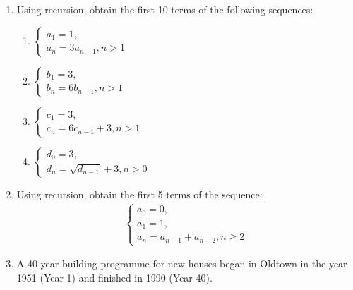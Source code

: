 \begin{enumerate}

\item 

Using recursion, obtain the first 10 terms of the following sequences:
\begin{enumerate}

\item 

\(\left\{\begin{array}{l}a_1 = 1,\\a_n = 3a_{n - 1}, n > 1\end{array}\right.\)

\item 

\(\left\{\begin{array}{l}b_1 = 3,\\b_n = 6b_{n - 1}, n > 1\end{array}\right.\)

\item 

\(\left\{\begin{array}{l}c_1 = 3,\\c_n = 6c_{n - 1} + 3, n > 1\end{array}\right.\)

\item 

\(\left\{\begin{array}{l}d_0 = 3,\\d_n = \sqrt{d_{n - 1}} + 3, n > 0\end{array}\right.\)

\end{enumerate}

\item 

Using recursion, obtain the first 5 terms of the  sequence:
\begin{equation*}
\begin{split}
   \left\{
       \begin{array}{l}
           a_0 = 0,\\
           a_1 = 1,\\
           a_n = a_{n - 1} + a_{n - 2}, n \geq 2
       \end{array}
   \right.
   \end{split}
\end{equation*}
\item 

A 40 year building programme for new houses began in Oldtown in the year 1951 (Year 1) and finished in 1990 (Year 40).



\end{enumerate}
